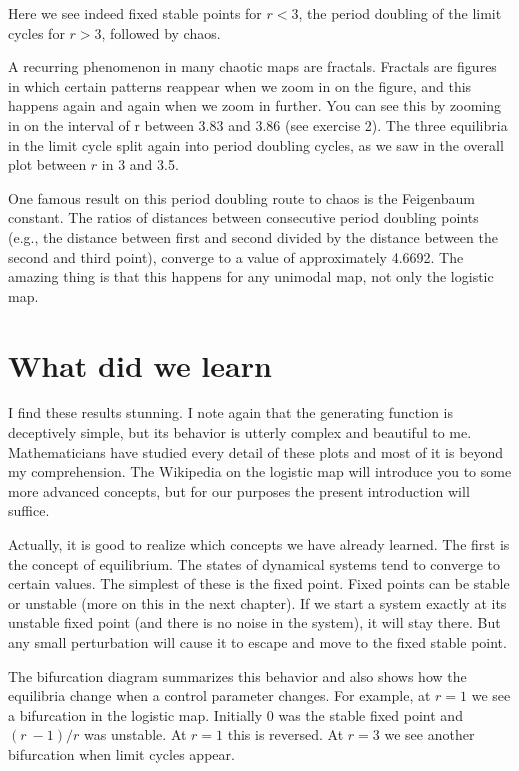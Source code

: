 \documentclass[
  a4paper,
  DIV=11,
  numbers=noendperiod,
  oneside]{scrreprt}
\begin{document}
Here we see indeed fixed stable points for \(r < 3\), the period
doubling of the limit cycles for \(r > 3\), followed by chaos.

A recurring phenomenon in many chaotic maps are fractals. Fractals are
figures in which certain patterns reappear when we zoom in on the
figure, and this happens again and again when we zoom in further. You
can see this by zooming in on the interval of r between 3.83 and 3.86
(see exercise 2). The three equilibria in the limit cycle split again
into period doubling cycles, as we saw in the overall plot between \(r\)
in 3 and 3.5.

One famous result on this period doubling route to chaos is the
Feigenbaum constant. The ratios of distances between consecutive period
doubling points (e.g., the distance between first and second divided by
the distance between the second and third point), converge to a value of
approximately 4.6692. The amazing thing is that this happens for any
unimodal map, not only the logistic map.

\hypertarget{sec-What-did-we-learn}{%
\section{What did we learn}\label{sec-What-did-we-learn}}

I find these results stunning. I note again that the generating function
is deceptively simple, but its behavior is utterly complex and beautiful
to me. Mathematicians have studied every detail of these plots and most
of it is beyond my comprehension. The Wikipedia on the logistic map will
introduce you to some more advanced concepts, but for our purposes the
present introduction will suffice.

Actually, it is good to realize which concepts we have already learned.
The first is the concept of equilibrium. The states of dynamical systems
tend to converge to certain values. The simplest of these is the fixed
point. Fixed points can be stable or unstable (more on this in the next
chapter). If we start a system exactly at its unstable fixed point (and
there is no noise in the system), it will stay there. But any small
perturbation will cause it to escape and move to the fixed stable point.

The bifurcation diagram summarizes this behavior and also shows how the
equilibria change when a control parameter changes. For example, at
\(r = 1\) we see a bifurcation in the logistic map. Initially 0 was the
stable fixed point and \((r\  - 1)/r\) was unstable. At \(r = 1\) this
is reversed. At \(r = 3\) we see another bifurcation when limit cycles
appear.
\end{document}
